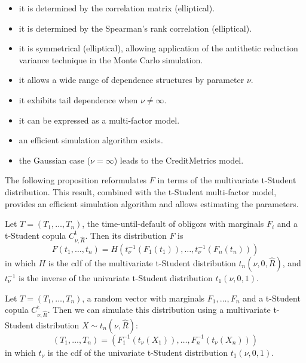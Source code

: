 \documentclass[11pt,fleqn]{book} %
\begin{document}
\begin{itemize}
	\item it is determined by the correlation matrix (elliptical). 
	\item it is determined by the Spearman's rank correlation (elliptical). 
	\item it is symmetrical (elliptical), allowing application of the 
	antithetic reduction variance technique in the Monte Carlo simulation.
	\item it allows a wide range of dependence structures by parameter $\nu$.
	\item it exhibits tail dependence when $\nu \ne \infty$.
	\item it can be expressed as a multi-factor model.
	\item an efficient simulation algorithm exists.
	\item the Gaussian case ($\nu = \infty$) leads to the 
	CreditMetrics\texttrademark{} model.
\end{itemize}

The following proposition reformulates $F$ in terms of the multivariate 
t-Student distribution. This result, combined with the t-Student multi-factor 
model, provides an efficient simulation algorithm and allows estimating the 
parameters.

\begin{proposition}
	\label{prop:dtd}
	Let $T=(T_1,\dots,T_n)$, the time-until-default of obligors with marginals 
	$F_i$ and a t-Student copula $C_{\nu,\widehat{R}}^{\text{t}}$. Then its distribution 
	$F$ is
	\begin{displaymath}
		F(t_1,\dots,t_n) = H\left(t_\nu^{-1}(F_1(t_1)), \dots, t_\nu^{-1}(F_n(t_n))\right)
	\end{displaymath}
	in which $H$ is the cdf of the multivariate t-Student distribution 
	$t_n(\nu,0,\widehat{R})$, and $t_\nu^{-1}$ is the inverse of the univariate 
	t-Student distribution $t_1(\nu,0,1)$.
\end{proposition}

\begin{corollary}
	\label{cor:dts1}
	Let $T=(T_1, \dots, T_n)$, a random vector with marginals 
	$F_1, \dots, F_n$ and a t-Student copula $C_{\nu,\widehat{R}}^{\text{t}}$. 
	Then we can simulate this distribution using a multivariate t-Student 
	distribution $X \sim t_n(\nu,\widehat{R})$:
	\begin{displaymath}
		(T_1, \dots, T_n) = \left(F_1^{-1}\left(t_{\nu}(X_1)\right), \dots, F_n^{-1}\left(t_{\nu}(X_n)\right)\right)
	\end{displaymath}
	in which $t_\nu$ is the cdf of the univariate t-Student distribution 
	$t_1(\nu,0,1)$.
\end{corollary}
\end{document}

